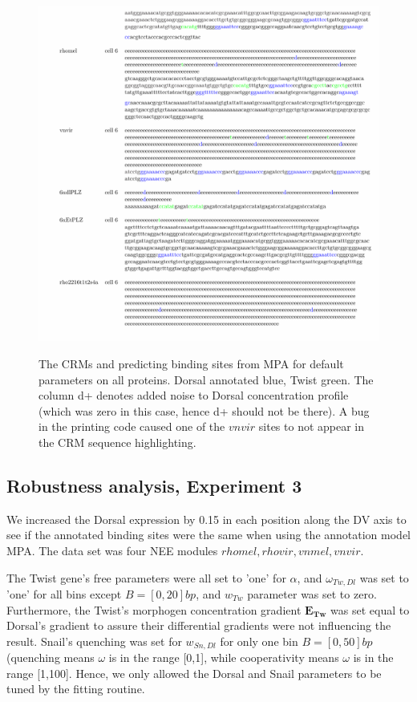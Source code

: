 \begin{figure}
  \includegraphics[width=1\textwidth]{annNosnail.pdf}\\
  \caption{The CRMs and predicting binding sites from MPA for default parameters on all proteins.  Dorsal annotated blue, Twist green. The column d+ denotes added noise to Dorsal concentration profile (which was zero in this case, hence d+ should not be there).  A bug in the printing code caused one of the $vnvir$ sites to not appear in the CRM sequence highlighting. }\label{roughfit}
\end{figure}




\subsection{Robustness analysis, Experiment 3 }
We increased the Dorsal expression by 0.15 in each position along the DV axis to see if the annotated binding sites were the same when using the annotation model MPA.  The data set was four NEE modules $rhomel, rhovir, vnmel, vnvir$.


The Twist gene's free parameters were all set to 'one' for $\alpha$, and $\omega_{Tw,Dl}$ was set to 'one' for all bins except $B=[0,20]bp$, and $w_{Tw}$ parameter was set to zero.  Furthermore, the Twist's morphogen concentration gradient $\bm{E_{Tw}}$ was set equal to Dorsal's gradient to assure their differential gradients were not influencing the result.  Snail's quenching was set for $w_{Sn,Dl}$ for only one bin $B=[0,50]bp$ (quenching means $\omega$ is in the range [0,1], while cooperativity means $\omega$ is in the range [1,100].  Hence, we only allowed the Dorsal and Snail parameters to be tuned by the fitting routine.
 
